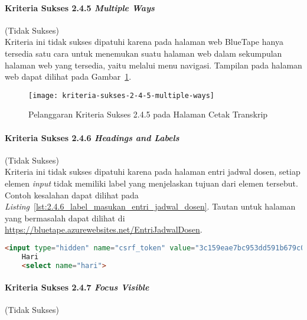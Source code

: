 \paragraph{Kriteria Sukses 2.4.5 \textit{Multiple Ways}}
\label{par:kepatuhan_bluetape_kriteria_sukses_2.4.5}
(Tidak Sukses)\\

Kriteria ini tidak sukses dipatuhi karena pada halaman web BlueTape hanya tersedia satu cara untuk menemukan suatu halaman web dalam sekumpulan halaman web yang tersedia, yaitu melalui menu navigasi. Tampilan pada halaman web dapat dilihat pada \mbox{Gambar \ref{fig:2.4.5_multiple_ways}}.

\begin{figure}[H]
    \centering  
    \texttt{[image: kriteria-sukses-2-4-5-multiple-ways]}  
    \caption[Pelanggaran Kriteria Sukses 2.4.5 pada Halaman Cetak Transkrip]{Pelanggaran Kriteria Sukses 2.4.5 pada Halaman Cetak Transkrip}
    \label{fig:2.4.5_multiple_ways}  
\end{figure}

\paragraph{Kriteria Sukses 2.4.6 \textit{Headings and Labels}}
\label{par:kepatuhan_bluetape_kriteria_sukses_2.4.6}
(Tidak Sukses)\\

Kriteria ini tidak sukses dipatuhi karena pada halaman entri jadwal dosen, setiap elemen \textit{input} tidak memiliki label yang menjelaskan tujuan dari elemen tersebut. Contoh kesalahan dapat dilihat pada \mbox{\textit{Listing} \ref{lst:2.4.6_label_masukan_entri_jadwal_dosen}}. Tautan untuk halaman yang bermasalah dapat dilihat di \mbox{\url{https://bluetape.azurewebsites.net/EntriJadwalDosen}}.

\begin{lstlisting}[frame=single, label={lst:2.4.6_label_masukan_entri_jadwal_dosen}, language=HTML, caption=Pelanggaran Kriteria Sukses 2.4.6 pada Halaman Entri Jadwal Dosen]
    <input type="hidden" name="csrf_token" value="3c159eae7bc953dd591b679c080ed066"/>
    Hari
    <select name="hari">
\end{lstlisting}

\paragraph{Kriteria Sukses 2.4.7 \textit{Focus Visible}}
\label{par:kepatuhan_bluetape_kriteria_sukses_2.4.7}
(Tidak Sukses)\\

